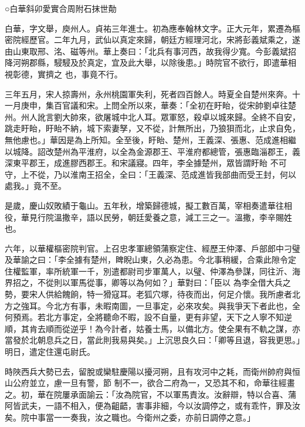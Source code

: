 
\begin{pinyinscope}

 ○白華斜卯愛實合周附石抹世勣



 白華，字文舉，庾州人。貞祐三年進士。初為應奉翰林文字。正大元年，累遷為樞密院經歷官。二年九月，武仙以真定來歸，朝廷方經理河北，宋將彭義斌乘之，遂由山東取邢、洺、磁等州。華上奏曰：「北兵有事河西，故我得少寬。今彭義斌招降河朔郡縣，駸駸及於真定，宜及此大舉，以除後患。」時院官不欲行，即遣華相視彰德，實擠之
 也，事竟不行。



 三年五月，宋人掠壽州，永州桃園軍失利，死者四百餘人。時夏全自楚州來奔。十一月庚申，集百官議和宋。上問全所以來，華奏：「全初在盱眙，從宋帥劉卓往楚州。州人訛言劉大帥來，欲屠城中北人耳。眾軍怒，殺卓以城來歸。全終不自安，跳走盱眙，盱眙不納，城下索妻孥，又不從，計無所出，乃狼狽而北，止求自免，無他慮也。」華因是為上所知。全至後，盱眙、楚州，王義深、張惠、范成進相繼以城降。詔改楚州為平淮府，以全為金源郡王、平淮府都總管，張惠臨淄郡王，義深東平郡王，成進膠西郡王。和宋議寢。四年，李全據楚州，眾皆謂盱眙
 不可守，上不從，乃以淮南王招全，全曰：「王義深、范成進皆我部曲而受王封，何以處我。」竟不至。



 是歲，慶山奴敗績于龜山。五年秋，增築歸德城，擬工數百萬，宰相奏遣華往相役，華見行院溫撒辛，語以民勞，朝廷愛養之意，減工三之一。溫撒，李辛賜姓也。



 六年，以華權樞密院判官。上召忠孝軍總領蒲察定住、經歷王仲澤、戶部郎中刁璧及華諭之曰：「李全據有楚州，睥睨山東，久必為患。今北事稍緩，合乘此隙令定住權監軍，率所統軍一千，別遣都尉司步軍萬人，以璧、仲澤為參謀，同往沂、海界招之，不從則以軍馬從事，卿等以為何如？」華對曰：「臣以
 為李全借大兵之勢，要宋人供給餽餉，特一猾寇耳。老狐穴塚，待夜而出，何足介懷。我所慮者北方之強耳。今北方有事，未暇南圖，一旦事定，必來攻矣。與我爭天下者此也，全何預焉。若北方事定，全將聽命不暇，設不自量，更有非望，天下之人寧不知逆順，其肯去順而從逆乎！為今計者，姑養士馬，以備北方。使全果有不軌之謀，亦當發於北朝息兵之日，當此則我易與矣。」上沉思良久曰：「卿等且退，容我更思。」明日，遣定住還屯尉氏。



 時陜西兵大勢已去，留脫或欒駐慶陽以擾河朔，且有攻河中之耗，而衛州帥府與恒山公府並立，慮一旦有警，節
 制不一，欲合二府為一，又恐其不和，命華往經畫之。初，華在院屢承面諭云：「汝為院官，不以軍馬責汝。汝辭辯，特以合喜、蒲阿皆武夫，一語不相入，便為齟齬，害事非細，今以汝調停之，或有乖忤，罪及汝矣。院中事當一一奏我，汝之職也。今衛州之委，亦前日調停之意。」




\end{pinyinscope}

